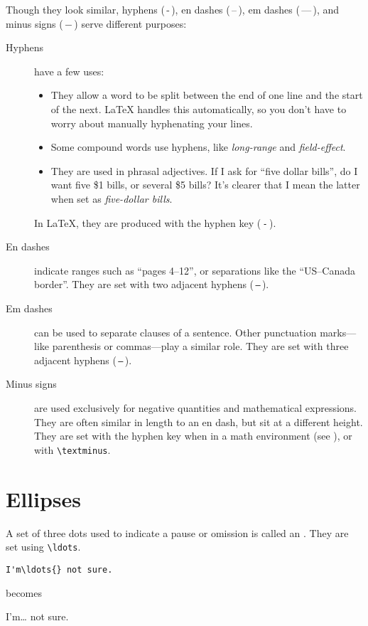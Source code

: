 Though they look similar,
hyphens (\,-\,), en dashes (\,--\,),
em dashes (\,---\,), and minus signs (\,$-$\,)
serve different purposes:
\begin{description}
\item[Hyphens] have a few uses:
    \begin{itemize}[leftmargin=*]
    \item They allow a word to be split between the end of one line and the
        start of the next.
        \LaTeX{} handles this automatically,
        so you don't have to worry about manually hyphenating your lines.
    \item Some compound words use hyphens, like \emph{long-range}
        and \emph{field-effect}.
    \item They are used in phrasal adjectives.
        If I ask for ``five dollar bills''\punckern,
        do I want five \$1 bills, or several \$5 bills?
        It's clearer that I mean the latter when set as
        \emph{five-dollar bills}.
    \end{itemize}
    In \LaTeX{}, they are produced with the hyphen key (\,\texttt{-}\,).

\item[En dashes] indicate ranges such as ``pages 4--12''\quotekern,
    or separations like the ``US--Canada border''\quotekern.
    They are set with two adjacent hyphens (\,\texttt{--}\,).

\item[Em dashes] can be used to separate clauses of a sentence.
    Other punctuation marks---like parenthesis or commas---play a similar
    role.
    They are set with three adjacent hyphens (\,\texttt{---}\,).

\item[Minus signs] are used exclusively for negative quantities and
    mathematical expressions.
    They are often similar in length to an en dash,
    but sit at a different height.
    They are set with the hyphen key when in a math environment
    (see ), or with \verb|\textminus|.
\end{description}

\section{Ellipses}

A set of three dots used to indicate a pause or omission is called an
.
They are set using \verb|\ldots|.
\begin{leftfigure}
\begin{lstlisting}
I'm\ldots{} not sure.
\end{lstlisting}
\end{leftfigure}
becomes
\begin{leftfigure}
\lm%
I'm\ldots{} not sure.
\end{leftfigure}

